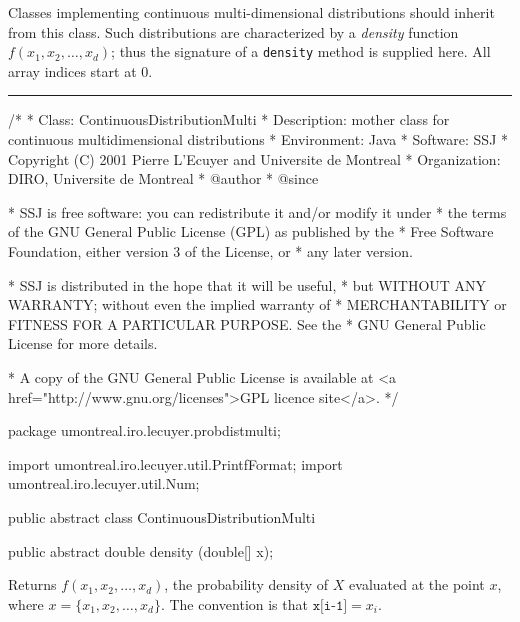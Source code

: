 
Classes implementing continuous multi-dimensional distributions should inherit 
from this class. Such distributions are characterized by a \emph{density}
 function $f(x_1, x_2, \ldots, x_d)$;
thus the signature of a \texttt{density} method is supplied here.
All array indices start at 0.

\bigskip\hrule

\begin{code}
\begin{hide}
/*
 * Class:        ContinuousDistributionMulti
 * Description:  mother class for continuous multidimensional distributions 
 * Environment:  Java
 * Software:     SSJ 
 * Copyright (C) 2001  Pierre L'Ecuyer and Universite de Montreal
 * Organization: DIRO, Universite de Montreal
 * @author       
 * @since

 * SSJ is free software: you can redistribute it and/or modify it under
 * the terms of the GNU General Public License (GPL) as published by the
 * Free Software Foundation, either version 3 of the License, or
 * any later version.

 * SSJ is distributed in the hope that it will be useful,
 * but WITHOUT ANY WARRANTY; without even the implied warranty of
 * MERCHANTABILITY or FITNESS FOR A PARTICULAR PURPOSE.  See the
 * GNU General Public License for more details.

 * A copy of the GNU General Public License is available at
   <a href="http://www.gnu.org/licenses">GPL licence site</a>.
 */
\end{hide}
package umontreal.iro.lecuyer.probdistmulti;
\begin{hide}
import umontreal.iro.lecuyer.util.PrintfFormat;
import umontreal.iro.lecuyer.util.Num;
\end{hide}

public abstract class ContinuousDistributionMulti\begin{hide} {
   protected int dimension;
\end{hide}


   public abstract double density (double[] x);
\end{code}
\begin{tabb} Returns $f(x_1, x_2, \ldots, x_d)$, the probability density of
  $X$ evaluated at the point
 $x$, where $x = \{x_1, x_2, \ldots, x_d\}$. The convention is that 
  $\texttt{x[i-1]} = x_i$.
\end{tabb}
\begin{htmlonly}
\end{htmlonly}
